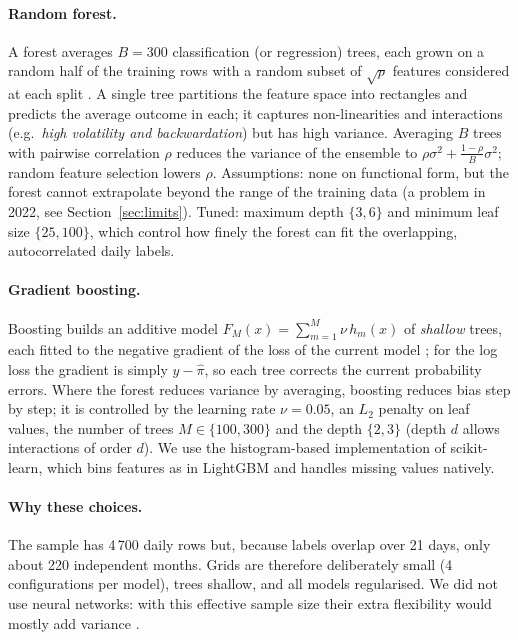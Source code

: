 \paragraph{Random forest.} A forest averages $B=300$ classification (or regression) trees, each grown on a
random half of the training rows with a random subset of $\sqrt{p}$ features considered at each split
\citep{breiman2001}. A single tree partitions the feature space into rectangles and predicts the average
outcome in each; it captures non-linearities and interactions (e.g.\ \emph{high volatility and backwardation})
but has high variance. Averaging $B$ trees with pairwise correlation $\rho$ reduces the variance of the
ensemble to $\rho\sigma^2+\frac{1-\rho}{B}\sigma^2$; random feature selection lowers $\rho$. Assumptions:
none on functional form, but the forest cannot extrapolate beyond the range of the training data (a problem
in 2022, see Section~\ref{sec:limits}). Tuned: maximum depth $\{3,6\}$ and minimum leaf size $\{25,100\}$,
which control how finely the forest can fit the overlapping, autocorrelated daily labels.

\paragraph{Gradient boosting.} Boosting builds an additive model $F_M(x)=\sum_{m=1}^M\nu\,h_m(x)$ of
\emph{shallow} trees, each fitted to the negative gradient of the loss of the current model
\citep{friedman2001}; for the log loss the gradient is simply $y-\hat\pi$, so each tree corrects the
current probability errors. Where the forest reduces variance by averaging, boosting reduces bias step by
step; it is controlled by the learning rate $\nu=0.05$, an $L_2$ penalty on leaf values, the number of trees
$M\in\{100,300\}$ and the depth $\{2,3\}$ (depth $d$ allows interactions of order $d$). We use the
histogram-based implementation of scikit-learn, which bins features as in LightGBM \citep{ke2017} and
handles missing values natively.

\paragraph{Why these choices.} The sample has 4\,700 daily rows but, because labels overlap over 21 days,
only about 220 independent months. Grids are therefore deliberately small (4 configurations per model),
trees shallow, and all models regularised. We did not use neural networks: with this effective sample size
their extra flexibility would mostly add variance \citep{gu2020}.
